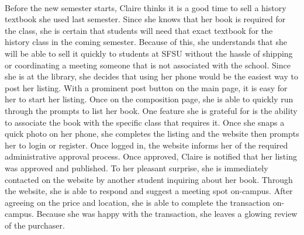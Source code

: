 \begin{description}[font=\bfseries\itshape]
\item[Use Case 6: Selling textbook (Claire)]\hfill\\
Before the new semester starts, Claire thinks it is a good time to sell a history textbook she used last semester.  Since she knows that her book is required for the class, she is certain that students will need that exact textbook for the history class in the coming semester.  Because of this, she understands that she will be able to sell it quickly to students at SFSU without the hassle of shipping or coordinating a meeting someone that is not associated with the school.  Since she is at the library, she decides that using her phone would be the easiest way to post her listing.  With a prominent post button on the main page, it is easy for her to start her listing.  Once on the composition page, she is able to quickly run through the prompts to list her book.  One feature she is grateful for is the ability to associate the book with the specific class that requires it.  Once she snaps a quick photo on her phone, she completes the listing and the website then prompts her to login or register.  Once logged in, the website informs her of the required administrative approval process.  Once approved, Claire is notified that her listing was approved and published.  To her pleasant surprise, she is immediately contacted on the website by another student inquiring about her book.  Through the website, she is able to respond and suggest a meeting spot on-campus.  After agreeing on the price and location, she is able to complete the transaction on-campus.  Because she was happy with the transaction, she leaves a glowing review of the purchaser.

\end{description}